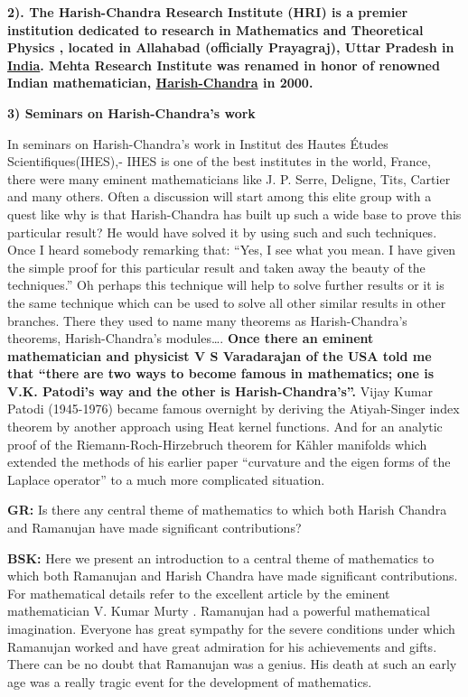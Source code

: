 \textbf{2). The Harish-Chandra Research Institute (HRI) is a premier institution dedicated to research in Mathematics and Theoretical Physics , located in Allahabad (officially Prayagraj), Uttar Pradesh in \underline{India}. Mehta  Research Institute was renamed in honor of renowned Indian mathematician, \underline{Harish-Chandra} in 2000.}

\textbf{3) Seminars on Harish-Chandra’s work}

In seminars on Harish-Chandra’s work in  Institut des Hautes Études Scientifiques(IHES),-  IHES is one of the best institutes in the world, France, there were many eminent mathematicians like J. P. Serre, Deligne, Tits, Cartier and many others.  Often a discussion will start among this elite group with a quest like why is that Harish-Chandra has built up such a wide base to prove this particular result?  He would have solved it by using such and such techniques. Once I heard somebody remarking that: “Yes, I see what you mean. I have given the simple proof for this particular result and taken away the beauty of the techniques.” Oh perhaps this technique will help to solve further results or it is the same technique which can be used to solve all other similar results in other branches.  There they used to name many theorems as Harish-Chandra’s theorems, Harish-Chandra’s modules….  \textbf{Once there an eminent mathematician and physicist V S Varadarajan of the USA told me that “there are two ways to become famous in mathematics; one is V.K. Patodi’s way and the other is Harish-Chandra’s”.} Vijay Kumar Patodi (1945-1976) became famous overnight by deriving the Atiyah-Singer index theorem by another approach using Heat kernel functions. And for an analytic proof of the Riemann-Roch-Hirzebruch theorem for Kähler manifolds which extended the methods of his earlier paper “curvature and the eigen forms of the Laplace operator” to a much more complicated situation.

\textbf{GR:} Is there any central theme of mathematics to which both Harish Chandra and Ramanujan have made significant contributions?

\textbf{BSK:} Here we present an introduction to a central theme of mathematics to which both Ramanujan and Harish Chandra have made significant contributions. For mathematical details refer to the excellent article by the eminent mathematician V. Kumar Murty \cite{chap13-key10VKM}. Ramanujan had a powerful mathematical imagination.  Everyone has great sympathy for the severe conditions under which Ramanujan worked and have great admiration for his achievements and gifts. There can be no doubt that Ramanujan was a genius. His death at such an early age was a really tragic event for the development of mathematics.
 
